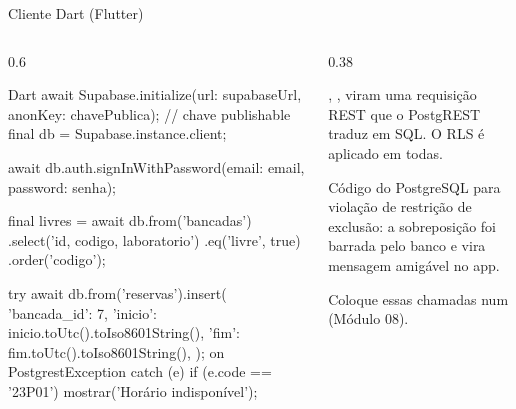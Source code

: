 \documentclass[aspectratio=169,10pt]{beamer}
\begin{document}
\begin{frame}[fragile]{Cliente Dart (Flutter)}
  \begin{columns}[T]
    \begin{column}{0.6\textwidth}
\begin{codigo}[title=supabase\_flutter]{Dart}
await Supabase.initialize(url: supabaseUrl,
    anonKey: chavePublica);          // chave publishable
final db = Supabase.instance.client;

await db.auth.signInWithPassword(email: email, password: senha);

final livres = await db.from('bancadas')
    .select('id, codigo, laboratorio')
    .eq('livre', true)
    .order('codigo');

try {
  await db.from('reservas').insert({
    'bancada_id': 7,
    'inicio': inicio.toUtc().toIso8601String(),
    'fim': fim.toUtc().toIso8601String(),
  });
} on PostgrestException catch (e) {
  if (e.code == '23P01') mostrar('Horário indisponível');
}
\end{codigo}
    \end{column}
    \begin{column}{0.38\textwidth}
      \begin{conceito}
        , ,  viram uma requisição REST que o PostgREST traduz em SQL. O RLS é aplicado em todas.
      \end{conceito}
      \begin{pordentro}[Código 23P01]
        Código do PostgreSQL para violação de restrição de exclusão: a sobreposição foi barrada pelo banco e vira mensagem amigável no app.
      \end{pordentro}
      \begin{dica}
        Coloque essas chamadas num  (Módulo 08).
      \end{dica}
    \end{column}
  \end{columns}
\end{frame}
\end{document}
